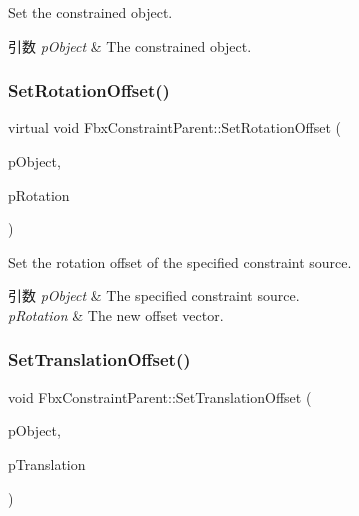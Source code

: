 Set the constrained object. 
\begin{DoxyParams}{引数}
{\em p\+Object} & The constrained object. \\
\hline
\end{DoxyParams}
\mbox{\label{class_fbx_constraint_parent_a22d24573f7d06251dcf94bb488a32386}} 
\subsubsection{\texorpdfstring{Set\+Rotation\+Offset()}{SetRotationOffset()}}
{\footnotesize\ttfamily virtual void Fbx\+Constraint\+Parent\+::\+Set\+Rotation\+Offset (\begin{DoxyParamCaption}\item[{const \hyperlink{class_fbx_object}{Fbx\+Object} $\ast$}]{p\+Object,  }\item[{\hyperlink{class_fbx_vector4}{Fbx\+Vector4}}]{p\+Rotation }\end{DoxyParamCaption})\hspace{0.3cm}{\ttfamily [virtual]}}

Set the rotation offset of the specified constraint source. 
\begin{DoxyParams}{引数}
{\em p\+Object} & The specified constraint source. \\
\hline
{\em p\+Rotation} & The new offset vector. \\
\hline
\end{DoxyParams}
\mbox{\label{class_fbx_constraint_parent_ae821dbbc810b2ee3f27c46d0a66ec55f}} 
\subsubsection{\texorpdfstring{Set\+Translation\+Offset()}{SetTranslationOffset()}}
{\footnotesize\ttfamily void Fbx\+Constraint\+Parent\+::\+Set\+Translation\+Offset (\begin{DoxyParamCaption}\item[{\hyperlink{class_fbx_object}{Fbx\+Object} $\ast$}]{p\+Object,  }\item[{\hyperlink{class_fbx_vector4}{Fbx\+Vector4}}]{p\+Translation }\end{DoxyParamCaption})}

